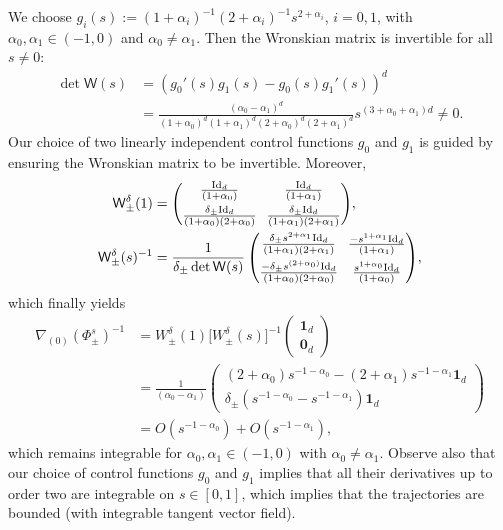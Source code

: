 \documentclass[JEP,XML,SOM,Unicode,NoFloatCountersInSection,published]{cedram}
\theoremstyle{definition}
\newcommand{\sW}{{\mathsf W}}
\newcommand{\I}{\textup{Id}}\let\Id\I
\newcommand{\U}{\mathbf{1}}
\newcommand{\V}{\mathbf{0}}
\begin{document}
We choose
$g_i(s) := (1+\alpha_i)^{-1} (2+\alpha_i)^{-1} s^{2+\alpha_i}$,
$i=0,1$, with $\alpha_0, \alpha_1 \in (-1,0)$ and
$\alpha_0 \not = \alpha_1$. Then the Wronskian matrix is
invertible for all $s \not =0$:
\begin{equation}
\begin{aligned}
\label{toy-jacobian}
\det \sW(s)
&= \left(g_0'(s) g_1(s)- g_0(s) g_1'(s)\right)^d \\
&= \frac{(\alpha_0 - \alpha_1)^d}{(1+\alpha_0)^d(1+\alpha_1)^d
(2+\alpha_0)^d(2+\alpha_1)^d} s^{(3+\alpha_0+\alpha_1)d} \not = 0.
\end{aligned}
\end{equation}
Our choice of two linearly independent control functions $g_0$
and $g_1$ is guided by ensuring the Wronskian matrix to be
invertible. Moreover,
\begin{equation*}
\begin{aligned}
\sW_\pm ^\delta (1) &=\arraycolsep3.5pt
\begin{pmatrix}
\frac{\I_d}{(1+\alpha_0)} & \frac{\I_d}{(1+\alpha_1)} \\[5pt]
\frac{\delta_\pm \I_d}{(1+\alpha_0)(2+\alpha_0)} &
\frac{\delta_\pm \I_d}{(1+\alpha_1)(2+\alpha_1)}
\end{pmatrix}\!, \\
\sW_\pm ^\delta (s)^{-1} &= \frac{1}{\delta_\pm\det \sW(s)}\arraycolsep3.5pt
\begin{pmatrix}
\frac{\delta_\pm s^{2+\alpha_1} \I_d}{(1+\alpha_1)(2+\alpha_1)} &
\frac{-s^{1+\alpha_1} \I_d}{(1+\alpha_1)} \\[5pt]
\frac{-\delta_\pm s^{(2+\alpha_0)} \I_d}{(1+\alpha_0)(2+\alpha_0)}
& \frac{s^{1+\alpha_0} \I_d}{(1+\alpha_0)}
\end{pmatrix}\!,
\end{aligned}
\end{equation*}
which finally yields
\begin{align*}
\nabla_{(0)} \left(\Phi_\pm ^s \right)^{-1}
& = W^\delta_\pm(1)\big[W^\delta_\pm(s)\big]^{-1}
\begin{pmatrix}
\U_d \\ \V_d
\end{pmatrix} \\
& = \frac{1}{(\alpha_0-\alpha_1)}
\begin{pmatrix}
(2+\alpha_0) s^{-1-\alpha_0} - (2+\alpha_1) s^{-1-\alpha_1}
\U_d
\\
\delta_\pm \left(s^{-1-\alpha_0} - s^{-1-\alpha_1} \right)
\U_d
\end{pmatrix}\\
&= O(s^{-1-\alpha_0}) + O(s^{-1-\alpha_1}),
\end{align*}
which remains integrable for $\alpha_0,\alpha_1 \in
(-1,0)$ with $\alpha_0 \neq \alpha_1$. Observe also that our choice of control functions $g_0$
and $g_1$ implies that all their derivatives up to order two are
integrable on $s \in [0,1]$, which implies that the trajectories
are bounded (with integrable tangent vector field).
\end{document}
